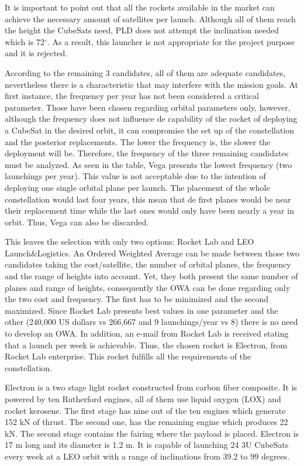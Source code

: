 It is important to point out that all the rockets available in the market can achieve the necessary amount of satellites per launch. Although all of them reach the height the CubeSats need, PLD does not attempt the inclination needed which is 72$^{\circ}$. As a result, this launcher is not appropriate for the project purpose and it is rejected. 

According to the remaining 3 candidates, all of them are adequate candidates, nevertheless there is a characteristic that may interfere with the mission goals. At first instance, the frequency per year has not been considered a critical parameter. Those have been chosen regarding orbital parameters only, however, although the frequency does not influence de capability of the rocket of deploying a CubeSat in the desired orbit, it can compromise the set up of the constellation and the posterior replacements. The lower the frequency is, the slower the deployment will be. Therefore, the frequency of the three remaining candidates must be analyzed. As seen in the table, Vega presents the lowest frequency (two launchings per year). This value is not acceptable due to the intention of deploying one single orbital plane per launch. The placement of the whole constellation would last four years, this mean that de first planes would be near their replacement time while the last ones would only have been nearly a year in orbit. Thus, Vega can also be discarded.
 
This leaves the selection with only two options: Rocket Lab and LEO Launch\&Logistics. An Ordered Weighted Average can be made between those two candidates taking the cost/satellite, the number of orbital planes, the frequency and the range of heights into account. Yet, they both present the same number of planes and range of heights, consequently the OWA can be done regarding only the two cost and frequency. The first has to be minimized and the second maximized. Since Rocket Lab presents best values in one parameter and the other (240,000 US dollars vs 266,667 and 9 launchings/year vs 8) there is no need to develop an OWA. In addition, an e-mail from Rocket Lab is received stating that a launch per week is achievable. Thus, the chosen rocket is Electron, from Rocket Lab enterprise. This rocket fulfills all the requirements of the constellation. 

Electron is a two stage light rocket constructed from carbon fiber composite. It is powered by ten Rutherford engines, all of them use liquid oxygen (LOX) and rocket kerosene. The first stage has nine out of the ten engines which generate 152 kN of thrust. The second one, has the remaining engine which produces 22 kN. The second stage contains the fairing where the payload is placed. Electron is 17 m long and its diameter is 1.2 m. It is capable of launching 24 3U CubeSats every week at a LEO orbit with a range of inclinations from 39.2 to 99 degrees. 

